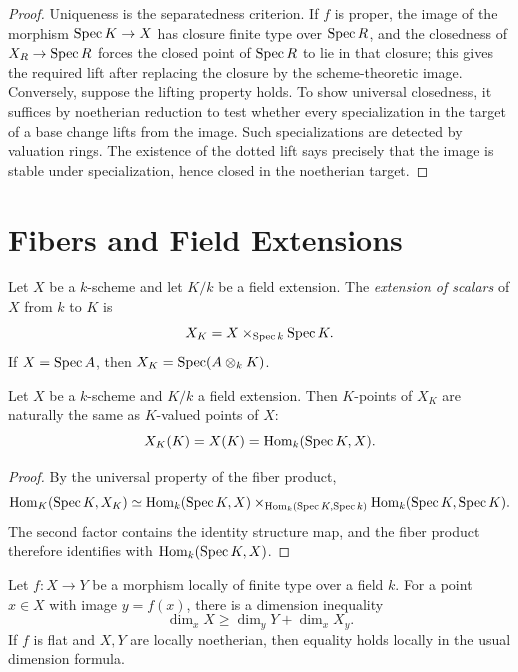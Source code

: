 \begin{proof}
Uniqueness is the separatedness criterion.  If \(f\) is proper, the image of
the morphism \(\operatorname{Spec} K\to X\) has closure finite type over \(\operatorname{Spec} R\), and the
closedness of \(X_R\to\operatorname{Spec} R\) forces the closed point of \(\operatorname{Spec} R\) to lie
in that closure; this gives the required lift after replacing the closure by
the scheme-theoretic image.  Conversely, suppose the lifting property holds.
To show universal closedness, it suffices by noetherian reduction to test
whether every specialization in the target of a base change lifts from the
image.  Such specializations are detected by valuation rings.  The existence
of the dotted lift says precisely that the image is stable under
specialization, hence closed in the noetherian target.
\end{proof}

\section{Fibers and Field Extensions}

\begin{definition}
Let \(X\) be a \(k\)-scheme and let \(K/k\) be a field extension.  The
\emph{extension of scalars} of \(X\) from \(k\) to \(K\) is
\[
    X_K=X\times_{\operatorname{Spec} k}\operatorname{Spec} K.
\]
If \(X=\operatorname{Spec} A\), then \(X_K=\operatorname{Spec}(A\otimes_k K)\).
\end{definition}

\begin{proposition}
Let \(X\) be a \(k\)-scheme and \(K/k\) a field extension.  Then \(K\)-points of
\(X_K\) are naturally the same as \(K\)-valued points of \(X\):
\[
    X_K(K)=X(K)=\operatorname{Hom}_k(\operatorname{Spec} K,X).
\]
\end{proposition}

\begin{proof}
By the universal property of the fiber product,
\[
    \operatorname{Hom}_K(\operatorname{Spec} K,X_K)
    \simeq
    \operatorname{Hom}_k(\operatorname{Spec} K,X)\times_{\operatorname{Hom}_k(\operatorname{Spec} K,\operatorname{Spec} k)}
    \operatorname{Hom}_k(\operatorname{Spec} K,\operatorname{Spec} K).
\]
The second factor contains the identity structure map, and the fiber product
therefore identifies with \(\operatorname{Hom}_k(\operatorname{Spec} K,X)\).
\end{proof}

\begin{proposition}
Let \(f:X\to Y\) be a morphism locally of finite type over a field \(k\).  For a
point \(x\in X\) with image \(y=f(x)\), there is a dimension inequality
\[
    \dim_x X \ge \dim_y Y+\dim_x X_y.
\]
If \(f\) is flat and \(X,Y\) are locally noetherian, then equality holds locally
in the usual dimension formula.
\end{proposition}

